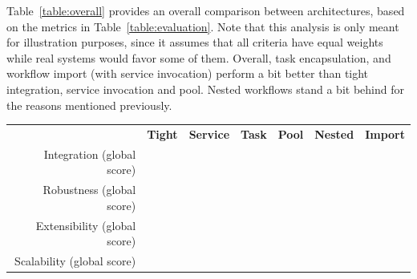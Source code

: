 \documentclass[preprint,3p,twocolumn]{elsarticle}
\begin{document}
Table~\ref{table:overall} provides an overall comparison between
architectures, based on the metrics in Table~\ref{table:evaluation}.
Note that this analysis is only meant for illustration purposes, since it
assumes that all criteria have equal weights while real systems would
favor some of them. Overall, task encapsulation, and workflow import (with
service invocation) perform a bit better than tight integration,
service invocation and pool. Nested workflows stand a bit behind for
the reasons mentioned previously.
\begin{table}
\footnotesize
\centering
\begin{tabular}{rcccccc}
                                    & \textbf{Tight}
                                    & \textbf{Service}
                                    & \textbf{Task}
                                    & \textbf{Pool}
                                    & \textbf{Nested}
                                    & \textbf{Import} \\
  Integration (global score)    &
                                    \cellcolor[HTML]{99FF99}{0.00}
                                    & \cellcolor[HTML]{99E899}{0.22}
                                    & \cellcolor[HTML]{99FF99}{0.00}
                                    & \cellcolor[HTML]{99D299}{0.44}
                                    & \cellcolor[HTML]{999999}{1.00}
                                      & \cellcolor[HTML]{99DD99}{0.33}\\
Robustness (global score) &
                                \cellcolor[HTML]{99F099}{0.14}
                                    & \cellcolor[HTML]{99D399}{0.43}
                                    & \cellcolor[HTML]{99FF99}{0.00}
                                    & \cellcolor[HTML]{99B699}{0.71}
                                    & \cellcolor[HTML]{999999}{1.00}
                                    & \cellcolor[HTML]{99D399}{0.43}\\
  Extensibility (global score)  & \cellcolor[HTML]{99D299}{0.44}
                                     & \cellcolor[HTML]{99D299}{0.44}
                                     & \cellcolor[HTML]{99FF99}{0.00}
                                     & \cellcolor[HTML]{99E899}{0.22}
                                     & \cellcolor[HTML]{999999}{1.00}
                                     & \cellcolor[HTML]{99E899}{0.22}\\
Scalability (global score)  & \cellcolor[HTML]{999999}{1.00}
                                     & \cellcolor[HTML]{99CC99}{0.50}
                                     & \cellcolor[HTML]{99CC99}{0.50}

\end{tabular}
\end{table}
\end{document}

